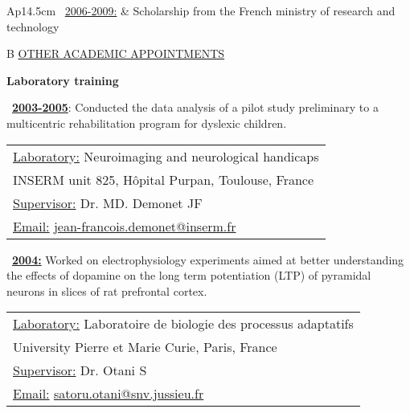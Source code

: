 \documentclass[a4paper,12pt,oneside]{letter}
\begin{document}
{\begin{tabular}{Ap{14.5cm}}
\textbullet~\underline{2006-2009:} & Scholarship from the French ministry of research and technology \\
\end{tabular}



\medskip 

\begin{tabular}{B}
\underline{OTHER ACADEMIC APPOINTMENTS}
\end{tabular}

\begin{center}
\large\textbf{Laboratory training}
\end{center}

\begin{minipage}[c]{7.7cm}
\textbullet~\underline{\textbf{2003-2005}}: Conducted the data analysis of a pilot study preliminary to a multicentric rehabilitation program for dyslexic children.
\end{minipage}
\hfill
\begin{minipage}[c]{10cm}
\setlength\minrowclearance{0.2cm}
\setlength\arrayrulewidth{1.5pt}
\small
\begin{tabular}[t]{|l|}\hline
\underline{Laboratory:} Neuroimaging and neurological handicaps\\
INSERM unit 825, Hôpital Purpan, Toulouse, France\\
\underline{Supervisor:} Dr. MD. Demonet JF\\
\underline{Email:} \href{mailto:jean-francois.demonet@inserm.fr}{jean-francois.demonet@inserm.fr}\\
\hline
\end{tabular}
\end{minipage}

\begin{minipage}[c]{6.7cm}
\textbullet~\underline{\textbf{2004:}}	Worked on electrophysiology experiments aimed at better understanding the effects of dopamine on the long term potentiation (LTP) of pyramidal neurons in slices of rat prefrontal cortex.
\end{minipage}
\hspace{3mm}
\begin{minipage}[c]{\textwidth}
\setlength\minrowclearance{0.1cm}
\setlength\arrayrulewidth{1.5pt}
\small
\begin{tabular}[c]{|l|}\hline
\underline{Laboratory:} Laboratoire de biologie des processus adaptatifs\\
University Pierre et Marie Curie, Paris, France\\
\underline{Supervisor:} Dr. Otani S\\
\underline{Email:} \href{mailto:satoru.otani@snv.jussieu.fr}{satoru.otani@snv.jussieu.fr}\\ \hline
\end{tabular}
\end{minipage}

}
\end{document}
